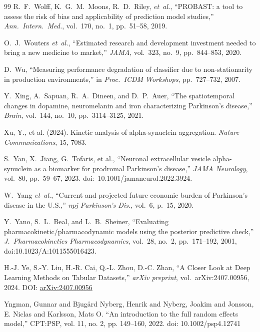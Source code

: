 \begin{thebibliography}{99}
R.~F.~Wolff, K.~G.~M.~Moons, R.~D.~Riley, \textit{et~al.}, ``PROBAST: a tool to assess the risk of bias and applicability of prediction model studies,'' \textit{Ann.\ Intern.\ Med.}, vol.~170, no.~1, pp.~51--58, 2019.

O.~J.~Wouters \textit{et~al.}, ``Estimated research and development investment needed to bring a new medicine to market,'' \textit{JAMA}, vol.~323, no.~9, pp.~844--853, 2020.

D.~Wu, ``Measuring performance degradation of classifier due to non-stationarity in production environments,'' in \textit{Proc.\ ICDM Workshops}, pp.~727--732, 2007.


Y.~Xing, A.~Sapuan, R.~A.~Dineen, and D.~P.~Auer, ``The spatiotemporal changes in dopamine, neuromelanin and iron characterizing Parkinson's disease,'' \textit{Brain}, vol.~144, no.~10, pp.~3114--3125, 2021.


Xu, Y., et al. (2024).
\newblock Kinetic analysis of alpha-synuclein aggregation.
\newblock \emph{Nature Communications}, 15, 7083.

S.~Yan, X.~Jiang, G.~Tofaris, et al., ``Neuronal extracellular vesicle alpha-synuclein as a biomarker for prodromal Parkinson's disease,'' \textit{JAMA Neurology}, vol.~80, pp.~59--67, 2023. doi:~10.1001/jamaneurol.2022.3924.

W.~Yang \textit{et~al.}, ``Current and projected future economic burden of Parkinson's disease in the U.S.,'' \textit{npj Parkinson's Dis.}, vol.~6, p.~15, 2020.

Y.~Yano, S.~L.~Beal, and L.~B.~Sheiner, ``Evaluating pharmacokinetic/pharmacodynamic models using the posterior predictive check,'' \textit{J.\ Pharmacokinetics Pharmacodynamics}, vol.~28, no.~2, pp.~171--192, 2001, doi:10.1023/A:1011555016423.

H.-J. Ye, S.-Y. Liu, H.-R. Cai, Q.-L. Zhou, D.-C. Zhan,
``A Closer Look at Deep Learning Methods on Tabular Datasets,''
\textit{arXiv preprint}, vol.~arXiv:2407.00956, 2024. DOI: \href{https://arxiv.org/abs/2407.00956}{arXiv:2407.00956}

 Yngman, Gunnar and Bjug{\aa}rd Nyberg, Henrik and Nyberg, Joakim and Jonsson, E. Niclas and Karlsson, Mats O. ``An introduction to the full random effects model,'' CPT:PSP, vol. 11, no. 2, pp. 149--160, 2022. doi: 10.1002/psp4.12741


\end{thebibliography}
